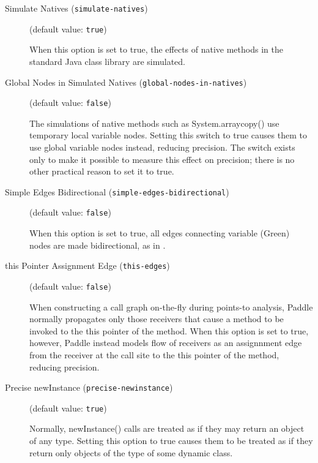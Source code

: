 \documentclass{article}
\begin{document}
\begin{description}
\item[Simulate Natives ({\tt simulate-natives})]
(default value: {\tt true})




When this option is set to true, the effects of native methods in the standard Java class library are simulated.
        


\item[Global Nodes in Simulated Natives ({\tt global-nodes-in-natives})]
(default value: {\tt false})




The simulations of native methods such as System.arraycopy() use
temporary local variable nodes. Setting this switch to true causes them
to use global variable nodes instead, reducing precision. The switch
exists only to make it possible to measure this effect on precision;
there is no other practical reason to set it to true.
        


\item[Simple Edges Bidirectional ({\tt simple-edges-bidirectional})]
(default value: {\tt false})




When this option is set to true, all edges connecting variable (Green)
nodes are made bidirectional, as in .
        


\item[this Pointer Assignment Edge ({\tt this-edges})]
(default value: {\tt false})




When constructing a call graph on-the-fly during points-to analysis, Paddle
normally propagates only those receivers that cause a method to be invoked
to the this pointer of the method. When this option is set to true, however,
Paddle instead models flow of receivers as an assignnment edge from the
receiver at the call site to the this pointer of the method, reducing
precision.
        


\item[Precise newInstance ({\tt precise-newinstance})]
(default value: {\tt true})




    Normally, newInstance() calls are treated as if they may return an object
    of any type. Setting this option to true causes them to be treated as if
    they return only objects of the type of some dynamic class.
            


\end{description}
\end{document}
